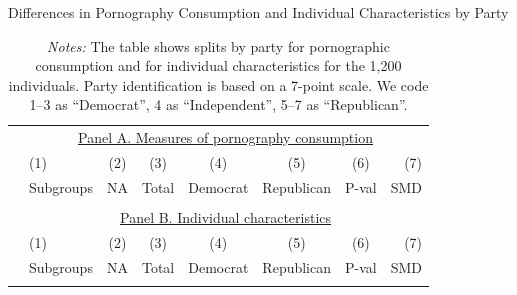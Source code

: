 \documentclass[12pt,twoside]{article}
\begin{document}
\begin{table}[!ht] \centering \ssmall \setlength\tabcolsep{9 pt}
	\caption{Differences in Pornography Consumption and Individual Characteristics by Party}
	\label{tab:characteristics_split_by_party}
	\begin{adjustbox}{max width=\textwidth}
		\begin{tabular}{@{\hspace{0\tabcolsep}}llrcccrr@{\hspace{0\tabcolsep}}}
			\toprule
			&\multicolumn{7}{c}{\underline{Panel A. Measures of pornography consumption}}\\
			&\multicolumn{1}{l}{(1)}&\multicolumn{1}{c}{(2)}&\multicolumn{1}{c}{(3)}&\multicolumn{1}{c}{(4)}&\multicolumn{1}{c}{(5)}&\multicolumn{1}{c}{(6)}&\multicolumn{1}{r}{(7)}\\			
			&\multicolumn{1}{l}{Subgroups}&\multicolumn{1}{c}{NA}&\multicolumn{1}{c}{Total}&\multicolumn{1}{c}{Democrat}&\multicolumn{1}{c}{Republican}&\multicolumn{1}{c}{P-val}&\multicolumn{1}{r}{SMD}\\
			\cmidrule{2-8}
			\\
			\cmidrule{2-8}
			&\multicolumn{7}{c}{\underline{Panel B. Individual characteristics}}\\
			&\multicolumn{1}{l}{(1)}&\multicolumn{1}{c}{(2)}&\multicolumn{1}{c}{(3)}&\multicolumn{1}{c}{(4)}&\multicolumn{1}{c}{(5)}&\multicolumn{1}{c}{(6)}&\multicolumn{1}{r}{(7)}\\			
			&\multicolumn{1}{l}{Subgroups}&\multicolumn{1}{c}{NA}&\multicolumn{1}{c}{Total}&\multicolumn{1}{c}{Democrat}&\multicolumn{1}{c}{Republican}&\multicolumn{1}{c}{P-val}&\multicolumn{1}{r}{SMD}\\
			\cmidrule{2-8}
			\\
			\bottomrule
		\end{tabular}
	\end{adjustbox}
	\caption*{\scriptsize \emph{Notes:}
		The table shows splits by party for pornographic consumption and for individual characteristics for the 1,200 individuals.
		Party identification is based on a 7-point scale. We code 1--3 as ``Democrat'', 4 as ``Independent'', 5--7 as ``Republican''.
}
\end{table}
\end{document}
